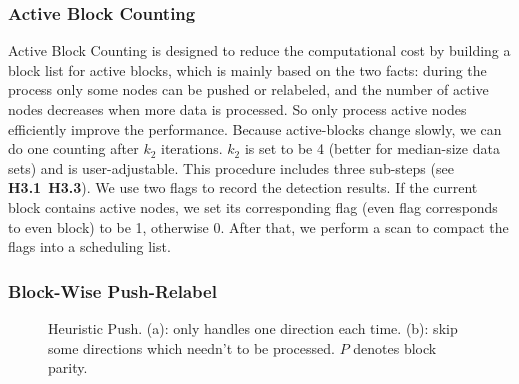 \subsubsection{Active Block Counting}

Active Block Counting is designed to reduce the computational cost by building a block list for active blocks, which is mainly based on the two facts: during the process only some nodes can be pushed or relabeled, and the number of active nodes decreases when more data is processed.
So only process active nodes efficiently improve the performance.
Because active-blocks change slowly, we can do one counting after $k_2$ iterations.
$k_2$ is set to be 4 (better for median-size data sets) and is user-adjustable.
This procedure includes three sub-steps (see \textbf{H3.1}~\textbf{H3.3}).
We use two flags to record the detection results.
If the current block contains active nodes, we set its corresponding flag (even flag corresponds to even block) to be 1, otherwise 0.
After that, we perform a scan to compact the flags into a scheduling list.

\subsubsection{Block-Wise Push-Relabel}

\begin{figure}
\centering
{}
\caption{Heuristic Push.
(a): only handles one direction each time.
(b): skip some directions which needn't to be processed. $P$ denotes block parity.
}
\label{figure heuristic push}
\end{figure}

